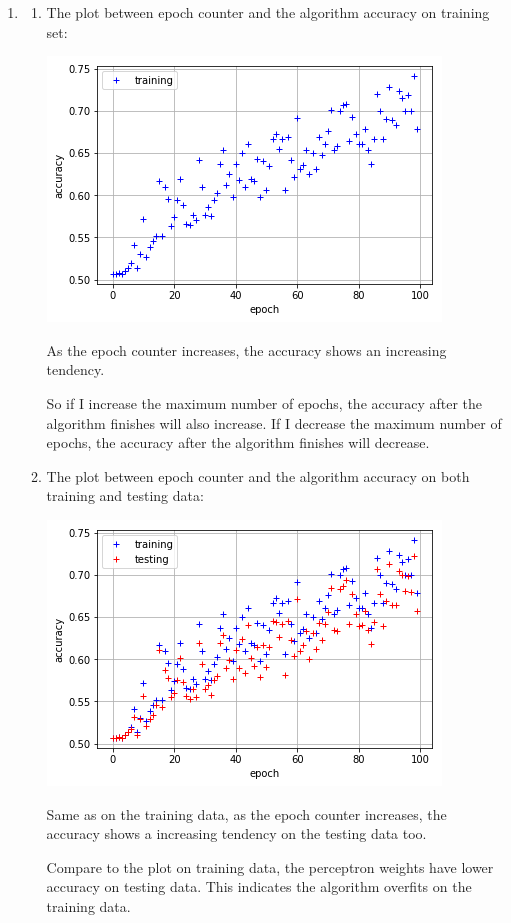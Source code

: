 \documentclass[paper=letter, fontsize=12pt]{article}
\begin{document}
\begin{enumerate}
\item 
\begin{enumerate}
	\item 
	The plot between epoch counter and the algorithm accuracy on training set:
	
	\includegraphics[scale=0.5]{p2q1a.png}
	
	As the epoch counter increases, the accuracy shows an increasing tendency.
	
	So if I increase the maximum number of epochs, the accuracy after the algorithm finishes will also increase. If I decrease the maximum number of epochs, the accuracy after the algorithm finishes will decrease.
	
	\item 
	The plot between epoch counter and the algorithm accuracy on both training and testing data:
	
	\includegraphics[scale=0.5]{p2q1b.png}
	
	Same as on the training data, as the epoch counter increases, the accuracy shows a increasing tendency on the testing data too.
	
	Compare to the plot on training data, the perceptron weights have lower accuracy on testing data. This indicates the algorithm overfits on the training data.
	

\end{enumerate}
\end{enumerate}
\end{document}
